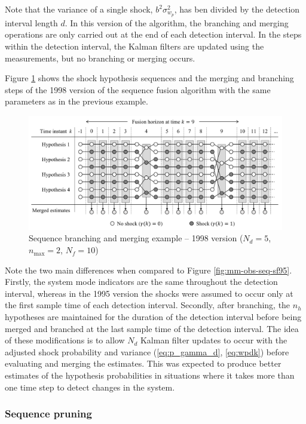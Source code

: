 {{Note that the variance of a single shock, $b^2\sigma_{w_p}^2$, has ben divided by the detection interval length $d$. In this version of the algorithm, the branching and merging operations are only carried out at the end of each detection interval. In the steps within the detection interval, the Kalman filters are updated using the measurements, but no branching or merging occurs.

Figure \ref{fig:mm-obs-seq-sf98} shows the shock hypothesis sequences and the merging and branching steps of the 1998 version of the sequence fusion algorithm with the same parameters as in the previous example.
\begin{figure}[ht]
	\centering
	\includegraphics[width=15cm]{images/mm_obs_seq_sf98.pdf}
	\caption{Sequence branching and merging example – 1998 version ($N_d=5$, $n_\text{max}=2$, $N_f=10$)}
	\label{fig:mm-obs-seq-sf98}
\end{figure}
Note the two main differences when compared to Figure \ref{fig:mm-obs-seq-sf95}. Firstly, the system mode indicators are the same throughout the detection interval, whereas in the 1995 version the shocks were assumed to occur only at the first sample time of each detection interval. Secondly, after branching, the $n_h$ hypotheses are maintained for the duration of the detection interval before being merged and branched at the last sample time of the detection interval. The idea of these modifications is to allow $N_d$ Kalman filter updates to occur with the adjusted shock probability and variance (\ref{eq:p_gamma_d}, \ref{eq:wpdk}) before evaluating and merging the estimates. This was expected to produce better estimates of the hypothesis probabilities in situations where it takes more than one time step to detect changes in the system.

\subsubsection{Sequence pruning} \label{sec:pruning}

}}
